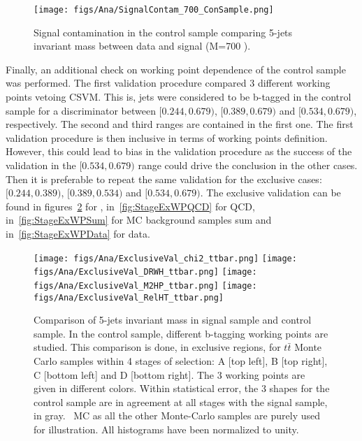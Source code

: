 \begin{figure}[!Hhtbp]
  \begin{center}
    \texttt{[image: figs/Ana/SignalContam\_700\_ConSample.png]}
    \caption{Signal contamination in the control sample comparing 5-jets invariant mass between data and signal (M=700 \GeVcc).}
    \label{fig:SigContamination}
  \end{center}
\end{figure}

Finally, an additional check on working point dependence of the control sample was performed. The first validation procedure compared 3 different working points vetoing CSVM. This is, jets were considered to be b-tagged in the control sample for a discriminator between $[0.244,0.679)$, $[0.389,0.679)$ and $[0.534,0.679)$, respectively. The second and third ranges are contained in the first one. The first validation procedure is then inclusive in terms of working points definition. However, this could lead to bias in the validation procedure as the success of the validation in the $[0.534,0.679)$ range could drive the conclusion in the other cases. Then it is preferable to repeat the same validation for the exclusive cases: $[0.244,0.389)$, $[0.389,0.534)$ and $[0.534,0.679)$. The exclusive validation can be found in figures~\ref{fig:StageExWPttbar} for \ttbar, in~\ref{fig:StageExWPQCD} for QCD, in~\ref{fig:StageExWPSum} for MC background samples sum and in~\ref{fig:StageExWPData} for data. %

\begin{figure}[!Hhtbp]
  \begin{center}
    \texttt{[image: figs/Ana/ExclusiveVal\_chi2\_ttbar.png]}
    \texttt{[image: figs/Ana/ExclusiveVal\_DRWH\_ttbar.png]}
    \texttt{[image: figs/Ana/ExclusiveVal\_M2HP\_ttbar.png]}
    \texttt{[image: figs/Ana/ExclusiveVal\_RelHT\_ttbar.png]}
    \caption{Comparison of 5-jets invariant mass in signal sample and control sample. In the control sample, different b-tagging working points are studied. This comparison is done, in exclusive regions, for $t\bar{t}$ Monte Carlo samples within 4 stages of selection: A [top left], B [top right], C [bottom left] and D [bottom right]. The 3 working points are given in different colors. Within statistical error, the 3 shapes for the control sample are in agreement at all stages with the signal sample, in gray. \ttbar~MC as all the other Monte-Carlo samples are purely used for illustration. All histograms have been normalized to unity.}
    \label{fig:StageExWPttbar}
  \end{center}
\end{figure}

